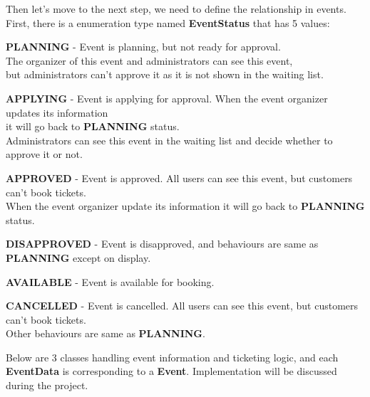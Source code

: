 \documentclass{article}
\begin{document}
\pagebreak
Then let's move to the next step, we need to define the relationship in events. 
First, there is a enumeration type named \textbf{EventStatus} that has 5 values: 
\begin{list}{}{}
    \item \textbf{PLANNING} - Event is planning, but not ready for approval.\\The organizer of this event and administrators can see this event,\\but administrators can't approve it as it is not shown in the waiting list.
    \item \textbf{APPLYING} - Event is applying for approval. When the event organizer updates its information\\it will  go back to \textbf{PLANNING} status.\\Administrators can see this event in the waiting list and decide whether to approve it or not.
    \item \textbf{APPROVED} - Event is approved. All users can see this event, but customers can't book tickets.\\When the event organizer update its information it will go back to \textbf{PLANNING} status.
    \item \textbf{DISAPPROVED} - Event is disapproved, and behaviours are same as \textbf{PLANNING} except on display.
    \item \textbf{AVAILABLE} - Event is available for booking.
    \item \textbf{CANCELLED} - Event is cancelled. All users can see this event, but customers can't book tickets.\\ Other behaviours are same as \textbf{PLANNING}.
\end{list}
 
Below are 3 classes handling event information and ticketing logic, and each \textbf{EventData} is corresponding to a \textbf{Event}.
Implementation will be discussed during the project.
\end{document}
